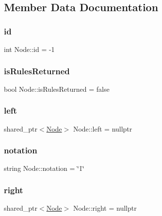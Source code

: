 \subsection{Member Data Documentation}
\mbox{\label{class_node_a59a543130a10c95f1e8642cf8c5645e8}} 
\subsubsection{\texorpdfstring{id}{id}}
{\footnotesize\ttfamily int Node\+::id = -\/1\hspace{0.3cm}{\ttfamily [private]}}

\mbox{\label{class_node_a9b7777ab2a657b4a901b3578bbf68831}} 
\subsubsection{\texorpdfstring{is\+Rules\+Returned}{isRulesReturned}}
{\footnotesize\ttfamily bool Node\+::is\+Rules\+Returned = false}

\mbox{\label{class_node_a978574f2c08939cfef1041041eb9c5be}} 
\subsubsection{\texorpdfstring{left}{left}}
{\footnotesize\ttfamily shared\+\_\+ptr$<$\hyperlink{class_node}{Node}$>$ Node\+::left = nullptr}

\mbox{\label{class_node_a0178acf2d687a5535122e4cdb1e8e079}} 
\subsubsection{\texorpdfstring{notation}{notation}}
{\footnotesize\ttfamily string Node\+::notation = \char`\"{}1\char`\"{}}

\mbox{\label{class_node_af68a851484bce64ed9463a50025df424}} 
\subsubsection{\texorpdfstring{right}{right}}
{\footnotesize\ttfamily shared\+\_\+ptr$<$\hyperlink{class_node}{Node}$>$ Node\+::right = nullptr}

